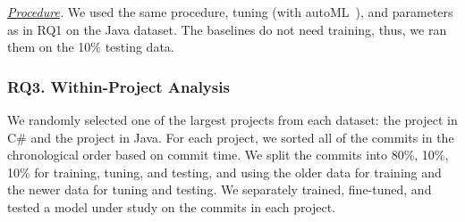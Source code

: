 
\textit{ \underline{Procedure}.}
We used the same procedure, tuning (with autoML~\cite{NNI}), and
parameters as in RQ1 on the Java dataset. The baselines do not need
training, thus, we ran them on the 10\% testing data.






\subsubsection{\bf RQ3. Within-Project Analysis}

We randomly selected one of the largest projects from each dataset:
the  project in C\# and
the  project in Java. For each
project, we sorted all of the commits in the chronological order based
on commit time. We split the commits into 80\%, 10\%, 10\% for
training, tuning, and testing, and using the older data for training
and the newer data for tuning and testing. We separately trained,
fine-tuned, and tested a model under study on the commits in each
project.


